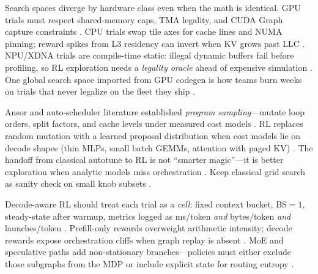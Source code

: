 Search spaces diverge by hardware class even when the math is identical. GPU trials must respect shared-memory caps, TMA legality, and CUDA Graph capture constraints \citep{nvidia2022hopper,semianalysis2024tma,nvidia2024cudagraphs}. CPU trials swap tile axes for cache lines and NUMA pinning; reward spikes from L3 residency can invert when KV grows past LLC \citep{dlbook,chen2020compilerbasedhardw}. NPU/XDNA trials are compile-time static: illegal dynamic buffers fail before profiling, so RL exploration needs a \emph{legality oracle} ahead of expensive simulation \citep{amd2024xdna,amd2024aie}. One global search space imported from GPU codegen is how teams burn weeks on trials that never legalize on the fleet they ship \citep{amd2024xdna,yirage2026}.

Ansor and auto-scheduler literature established \emph{program sampling}---mutate loop orders, split factors, and cache levels under measured cost models \citep{chen2020compilerbasedhardw,dlbook}. RL replaces random mutation with a learned proposal distribution when cost models lie on decode shapes (thin MLPs, small batch GEMMs, attention with paged KV) \citep{taxbreak2026,kwon2023vllm,dao2022flashattention,memoryfloor2026,patel2025llminference}. The handoff from classical autotune to RL is not ``smarter magic''---it is better exploration when analytic models miss orchestration \citep{yirage2026,chen2020compilerbasedhardw,semianalysis2024tma,amd2024xdna,amd2024aie,dlbook,liu2024deepseekv3,dao2023flashdecoding,nvidia2024cudagraphs,nvidia2022hopper}. Keep classical grid search as sanity check on small knob subsets \citep{chen2020compilerbasedhardw,memoryfloor2026,taxbreak2026}.

Decode-aware RL should treat each trial as a \emph{cell}: fixed context bucket, BS${=}1$, steady-state after warmup, metrics logged as ms/token \emph{and} bytes/token \emph{and} launches/token \citep{memoryfloor2026,taxbreak2026,patel2025llminference}. Prefill-only rewards overweight arithmetic intensity; decode rewards expose orchestration cliffs when graph replay is absent \citep{nvidia2024cudagraphs,memoryfloor2026}. MoE and speculative paths add non-stationary branches---policies must either exclude those subgraphs from the MDP or include explicit state for routing entropy \citep{liu2024deepseekv3,taxbreak2026,kwon2023vllm}.

